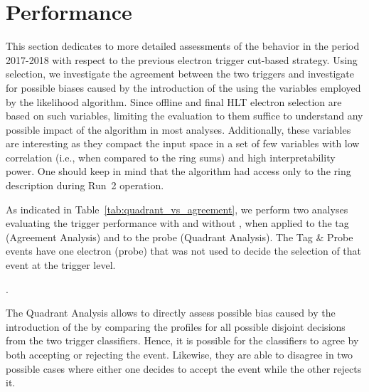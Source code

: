 
\chapter{\rnn{} Performance}%
\label{sec:off_ana}

This section dedicates to more detailed assessments of the \rnn{} behavior 
in the period 2017-2018 with respect to the previous electron trigger cut-based strategy.
Using \Zee{} \tnp{}
selection, we investigate the agreement between the two triggers and investigate
for possible biases caused by the introduction of the \rnn{} using the variables
employed by the likelihood algorithm. Since offline and final HLT electron
selection are based on such variables, limiting the evaluation to them suffice
to understand any possible impact of the \rnn{} algorithm in most analyses.
Additionally, these variables are interesting as they compact the input space
in a set of few variables with low correlation (i.e., when compared to the ring
sums) and high interpretability power. One should keep in mind that the \rnn{}
algorithm had access only to the ring description during Run~2 operation.

As indicated in Table~\ref{tab:quadrant_vs_agreement}, we perform two analyses evaluating the
trigger performance with and without \rnn{}, when applied to the tag (Agreement Analysis) and
to the probe (Quadrant Analysis). The Tag \& Probe events have one electron (probe) that was not used to decide the selection of that event at the trigger level.


\begin{table}[ht!]\footnotesize
\centering
\caption{Customized \Zee{} \tap{} selection criteria employed in the
agreement and quadrant analyses in the Run 2 (2017-2018 period)}.%
\label{tab:quadrant_vs_agreement}
\end{table}

The Quadrant Analysis allows to directly assess possible bias caused by the
introduction of the \rnn{} by comparing the profiles for all possible disjoint
decisions from the two trigger classifiers. Hence, it is possible for the classifiers
to agree by both accepting or rejecting the event. Likewise, they are able to
disagree in two possible cases where either one decides to accept the event
while the other rejects it.


